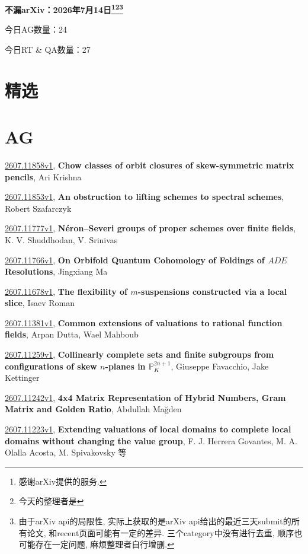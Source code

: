 \documentclass[9pt, a4paper]{article}
\theoremstyle{plain}
\theoremstyle{definition}
\theoremstyle{remark}
\newcommand{\arxiv}[3]{\href{https://arxiv.org/abs/#1}{#1}, \textbf{\textcolor{arxivblue}{#2}}, #3}
\newcommand{\AGnumber}{24}
\newcommand{\RTQAnumber}{27}
\newcommand{\NewestDate}{2026年7月14日}
\newcommand{\todayarXiver}{} %
\begin{document}
\begin{center}
    \Huge\textbf{不漏arXiv：\NewestDate\footnote{感谢arXiv提供的服务.}\footnote{今天的整理者是\todayarXiver}\footnote{由于arXiv api的局限性, 实际上获取的是arXiv api给出的最近三天submit的所有论文, 和recent页面可能有一定的差异. 三个category中没有进行去重, 顺序也可能存在一定问题, 麻烦整理者自行增删.}} \\
\end{center}

\setcounter{section}{-1}

\begin{center}
    今日AG数量：\AGnumber
    
    今日RT \& QA数量：\RTQAnumber
    
\end{center}


\section{精选}


\section{AG}
\arxiv{2607.11858v1}{Chow classes of orbit closures of skew-symmetric matrix pencils}{Ari Krishna}

\arxiv{2607.11853v1}{An obstruction to lifting schemes to spectral schemes}{Robert Szafarczyk}

\arxiv{2607.11777v1}{Néron--Severi groups of proper schemes over finite fields}{K. V. Shuddhodan, V. Srinivas}

\arxiv{2607.11766v1}{On Orbifold Quantum Cohomology of Foldings of $ADE$ Resolutions}{Jingxiang Ma}

\arxiv{2607.11678v1}{The flexibility of $m$-suspensions constructed via a local slice}{Isaev Roman}

\arxiv{2607.11381v1}{Common extensions of valuations to rational function fields}{Arpan Dutta, Wael Mahboub}

\arxiv{2607.11259v1}{Collinearly complete sets and finite subgroups from configurations of skew $n$-planes in $\mathbb P^{2n+1}_K$}{Giuseppe Favacchio, Jake Kettinger}

\arxiv{2607.11242v1}{4x4 Matrix Representation of Hybrid Numbers, Gram Matrix and Golden Ratio}{Abdullah Mağden}

\arxiv{2607.11223v1}{Extending valuations of local domains to complete local domains without changing the value group}{F. J. Herrera Govantes, M. A. Olalla Acosta, M. Spivakovsky 等}
\end{document}
